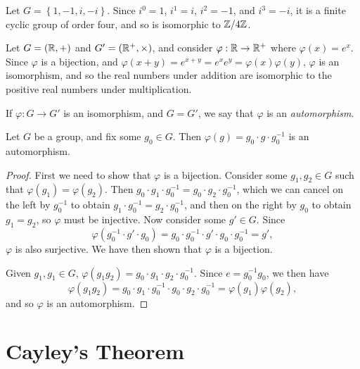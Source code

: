 \begin{exmp}
    Let $G = \left\{1, -1, i, -i\right\}$. Since $i^0 = 1$, $i^1 = i$, $i^2 = -1$, and $i^3 = -i$, it is a finite cyclic group of order four, and so is isomorphic to $\mathbb{Z}/4\mathbb{Z}$.
\end{exmp}

\begin{exmp}
    Let $G = \left(\mathbb{R}, +\right)$ and $G' = \left(\mathbb{R}^+, \times\right)$, and consider $\varphi: \mathbb{R} \to \mathbb{R}^+$ where $\varphi(x) = e^x$. Since $\varphi$ is a bijection, and $\varphi(x + y) = e^{x+y} = e^xe^y = \varphi(x)\varphi(y)$, $\varphi$ is an isomorphism, and so the real numbers under addition are isomorphic to the positive real numbers under multiplication.
\end{exmp}

\begin{defn}
    If $\varphi: G \to G'$ is an isomorphism, and $G = G'$, we say that $\varphi$ is an \emph{automorphism}.
\end{defn}

\begin{prop}
    Let $G$ be a group, and fix some $g_0 \in G$. Then $\varphi(g) = g_0 \cdot g \cdot g_0^{-1}$ is an automorphism.
\end{prop}

\begin{proof}
    First we need to show that $\varphi$ is a bijection. Consider some $g_1, g_2 \in G$ such that $\varphi(g_1) = \varphi(g_2)$. Then $g_0 \cdot g_1 \cdot g_0^{-1} = g_0 \cdot g_2 \cdot g_0^{-1}$, which we can cancel on the left by $g_0^{-1}$ to obtain $g_1 \cdot g_0^{-1} = g_2 \cdot g_0^{-1}$, and then on the right by $g_0$ to obtain $g_1 = g_2$, so $\varphi$ must be injective. Now consider some $g' \in G$. Since \[\varphi(g_0^{-1} \cdot g' \cdot g_0) = g_0 \cdot g_0^{-1} \cdot g' \cdot g_0 \cdot g_0^{-1} = g',\] $\varphi$ is also surjective. We have then shown that $\varphi$ is a bijection.

    Given $g_1, g_1 \in G$, $\varphi(g_1g_2) = g_0 \cdot g_1 \cdot g_2 \cdot g_0^{-1}$. Since $e = g_0^{-1}g_0$, we then have
    \[\varphi(g_1g_2) = g_0 \cdot g_1 \cdot g_0^{-1} \cdot g_0 \cdot g_2 \cdot g_0^{-1} = \varphi(g_1)\varphi(g_2),\] and so $\varphi$ is an automorphism.
\end{proof}

\section{Cayley's Theorem}

